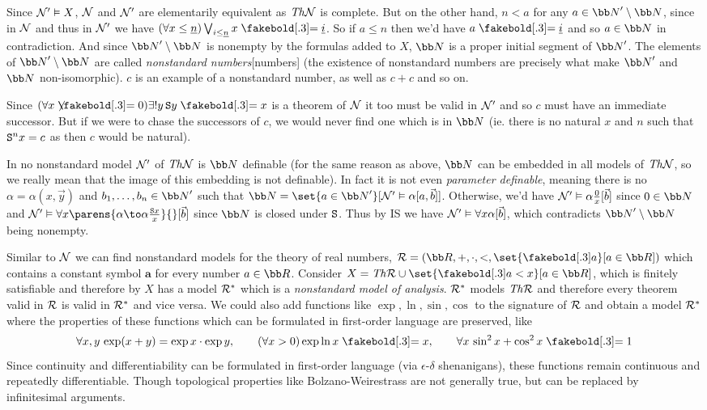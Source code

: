 Since ${\cal N}'\vDash X$, ${\cal N}$ and ${\cal N}'$ are elementarily equivalent as ${\it Th}{\cal N}$ is complete.
But on the other hand, $n<a$ for any $a\in{\bb N}'\setminus{\bb N}$, since in ${\cal N}$ and thus in ${\cal N}'$ we have $(\forall x\leq\underline n)\bigvee_{i\leq\underline n}x\eq\underline i$.
So if $a\leq n$ then we'd have $a\eq\underline i$ and so $a\in{\bb N}$ in contradiction.
And since ${\bb N}'\setminus{\bb N}$ is nonempty by the formulas added to $X$, ${\bb N}$ is a proper initial segment of ${\bb N}'$.
The elements of ${\bb N}'\setminus{\bb N}$ are called {\it nonstandard numbers}[numbers] (the existence of nonstandard numbers are precisely what make ${\bb N}'$ and ${\bb N}$
non-isomorphic).
$c$ is an example of a nonstandard number, as well as $c+c$ and so on.

Since $(\forall x\neqb0)\exists!y\,{\tt S}y\eq x$ is a theorem of ${\cal N}$ it too must be valid in ${\cal N}'$ and so $c$ must have an immediate successor.
But if we were to chase the successors of $c$, we would never find one which is in ${\bb N}$ (ie. there is no natural $x$ and $n$ such that ${\tt S}^nx=c$ as then $c$ would be natural).

In no nonstandard model ${\cal N}'$ of ${\it Th}{\cal N}$ is ${\bb N}$ definable (for the same reason as above, ${\bb N}$ can be embedded in all models of ${\it Th}{\cal N}$, so we really mean that the image of this
embedding is not definable).
In fact it is not even {\it parameter definable}, meaning there is no $\alpha=\alpha(x,\vec y)$ and $b_1,\dots,b_n\in{\bb N}'$ such that ${\bb N}=\set{a\in{\bb N}'}[{\cal N}'\vDash\alpha{[a,\vec b]}]$.
Otherwise, we'd have ${\cal N}'\vDash\alpha\frac0x[\vec b]$ since $0\in{\bb N}$ and ${\cal N}'\vDash\forall x\parens{\alpha\to\alpha\frac{{\tt S}x}x}{}[\vec b]$ since ${\bb N}$ is closed under ${\tt S}$.
Thus by IS we have ${\cal N}'\vDash\forall x\alpha[\vec b]$, which contradicts ${\bb N}'\setminus{\bb N}$ being nonempty.

Similar to ${\cal N}$ we can find nonstandard models for the theory of real numbers, ${\cal R}=({\bb R},+,\cdot,<,\set{\boldsymbol a}[a\in{\bb R}])$ which contains a constant symbol $\boldsymbol a$ for every
number $a\in{\bb R}$.
Consider $X=\Th{\cal R}\cup\set{\boldsymbol a<x}[a\in{\bb R}]$, which is finitely satisfiable and therefore by  $X$ has a model ${\cal R}^*$ which is a {\it nonstandard
model of analysis}.
${\cal R}^*$ models ${\it Th}{\cal R}$ and therefore every theorem valid in ${\cal R}$ is valid in ${\cal R}^*$ and vice versa.
We could also add functions like $\exp,\ln,\sin,\cos$ to the signature of ${\cal R}$ and obtain a model ${\cal R}^*$ where the properties of these functions which can be formulated in first-order language
are preserved, like
$$ \forall x,y\,\exp(x+y)=\exp x\cdot\exp y,\qquad (\forall x>0)\exp\ln x\eq x,\qquad \forall x\,\sin^2x+\cos^2x\eq1 $$
Since continuity and differentiability can be formulated in first-order language (via $\epsilon$-$\delta$ shenanigans), these functions remain continuous and repeatedly differentiable.
Though topological properties like Bolzano-Weirestrass are not generally true, but can be replaced by infinitesimal arguments.

